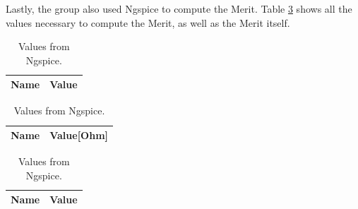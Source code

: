 Lastly, the group also used Ngspice to compute the Merit. Table \ref{tab:merit} shows all the 
values necessary to compute the Merit, as well as the Merit itself.

\begin{table}[h]
	\centering
	\begin{tabular}{|l|r|}
		\hline    
		{\bf Name} & {\bf Value} \\ \hline
    		
	\end{tabular}
	
	\caption{Values from Ngspice.}
    
\label{tab:op_sim}
\end{table}

\begin{table}[h]
	\centering
	\begin{tabular}{|l|r|}
		\hline    
		{\bf Name} & {\bf Value[Ohm]} \\ \hline
    		
    		
	\end{tabular}
	
	\caption{Values from Ngspice.}
    
\label{tab:imp_sim}
\end{table}

\begin{table}[h]
	\centering
	\begin{tabular}{|l|r|}
		\hline    
		{\bf Name} & {\bf Value} \\ \hline
    		
	\end{tabular}
	
	\caption{Values from Ngspice.}
    
\label{tab:merit}
\end{table}



